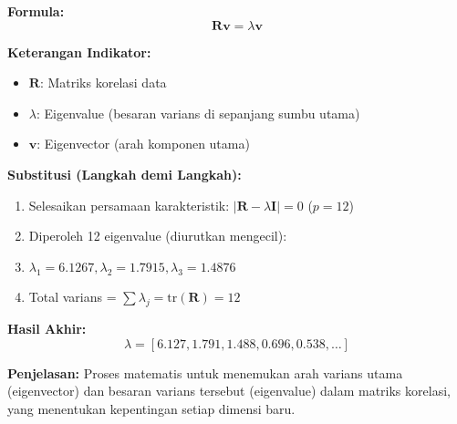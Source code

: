 \documentclass[11pt,a4paper]{article}
\begin{document}
\begin{tcolorbox}[formula_box, title={Dekomposisi Eigen}]
\textbf{Formula:}
\[ \mathbf{R}\mathbf{v}=\lambda\mathbf{v} \]

\textbf{Keterangan Indikator:}
\begin{itemize}
  \item $\mathbf{R}$: Matriks korelasi data
  \item $\lambda$: Eigenvalue (besaran varians di sepanjang sumbu utama)
  \item $\mathbf{v}$: Eigenvector (arah komponen utama)
\end{itemize}

\textbf{Substitusi (Langkah demi Langkah):}
\begin{enumerate}
  \item Selesaikan persamaan karakteristik: $|\mathbf{R} - \lambda\mathbf{I}| = 0$ ($p=12$)
  \item Diperoleh 12 eigenvalue (diurutkan mengecil):
  \item $\lambda_1=6.1267, \lambda_2=1.7915, \lambda_3=1.4876$
  \item Total varians = $\sum\lambda_j = \text{tr}(\mathbf{R}) = 12$
\end{enumerate}

\textbf{Hasil Akhir:}
\[ \lambda = [6.127, 1.791, 1.488, 0.696, 0.538, \ldots] \]

\textbf{Penjelasan:} Proses matematis untuk menemukan arah varians utama (eigenvector) dan besaran varians tersebut (eigenvalue) dalam matriks korelasi, yang menentukan kepentingan setiap dimensi baru.
\end{tcolorbox}
\end{document}
